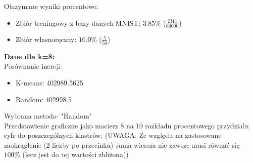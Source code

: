 \documentclass[a4paper,14pt]{report}
\begin{document}
	Otrzymane wyniki procentowe:
	\begin{itemize}
		\item Zbiór treningowy z bazy danych MNIST: $3.85\%$ ($\frac{2311}{60000}$)
		\item Zbiór własnoręczny: $10.0\%$ ($\frac{5}{50}$)
	\end{itemize}
	\textbf{Dane dla k=8: } \\
	Porównanie inercji: 
	\begin{itemize}
		\item K-means: 402989.5625
		\item Random: 402998.5
	\end{itemize}
	Wybrana metoda- "Random" \\
	Przedstawienie graficzne jako macierz 8 na 10 rozkładu procentowego przydziału cyfr do poszczególnych klastrów:
	(UWAGA: Ze względu na zastosowane zaokrąglenie (2 liczby po przecinku) suma wiersza nie zawsze musi równać się $100\%$ (lecz jest do tej wartości zbliżona))
\end{document}
